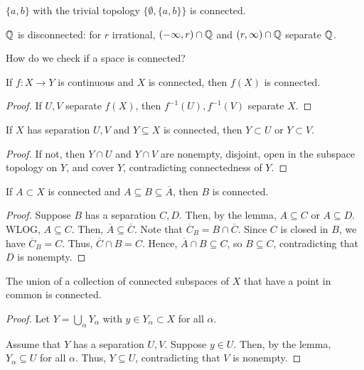 \begin{example}
    $\{a,b\}$ with the trivial topology $\{\emptyset,\{a,b\}\}$ is connected.
\end{example}

\begin{example}
    $\mathbb{Q}$ is disconnected: for $r$ irrational, $(-\infty,r)\cap \mathbb{Q}$ and $(r,\infty)\cap \mathbb{Q}$ separate $\mathbb{Q}$.
\end{example}


How do we check if a space is connected? 

\begin{theorem}
    If $f:X\to Y$ is continuous and $X$ is connected, then $f(X)$ is connected.
\end{theorem}
\begin{proof}
    If $U,V$ separate $f(X)$, then $f^{-1}(U), f^{-1}(V)$ separate $X$.
\end{proof}

\begin{lemma}
    If $X$ has separation $U, V$ and $Y\subseteq X$ is connected, then $Y\subset U$ or $Y\subset V$.
\end{lemma}
\begin{proof}
    If not, then $Y\cap U$ and $Y\cap V$ are nonempty, disjoint, open in the subspace topology on $Y$, and cover $Y$, contradicting connectedness of $Y$.
\end{proof}

\begin{theorem}
    If $A\subset X$ is connected and $A\subseteq B\subseteq \overline{A}$, then $B$ is connected.
\end{theorem}

\begin{proof}
    Suppose $B$ has a separation $C,D$. Then, by the lemma, $A\subseteq C$ or $A\subseteq D$. WLOG, $A\subseteq C$. Then, $\overline{A}\subseteq \overline{C}$. Note that $\overline{C}_B=B\cap \overline{C}$. Since $C$ is closed in $B$, we have $\overline{C}_B=C$. Thus, $\overline{C}\cap B=C$. Hence, $\overline{A}\cap B\subseteq C$, so $B\subseteq C$, contradicting that $D$ is nonempty. 
\end{proof}

\begin{theorem}
    The union of a collection of connected subspaces of $X$ that have a point in common is connected.
\end{theorem}
\begin{proof}
    Let $Y=\bigcup_\alpha Y_\alpha$ with $y\in Y_\alpha\subset X$ for all $\alpha$. 

    Assume that $Y$ has a separation $U,V$. Suppose $y\in U$. Then, by the lemma, $Y_\alpha\subseteq U$ for all $\alpha$. Thus, $Y\subseteq U$, contradicting that $V$ is nonempty.
\end{proof}

